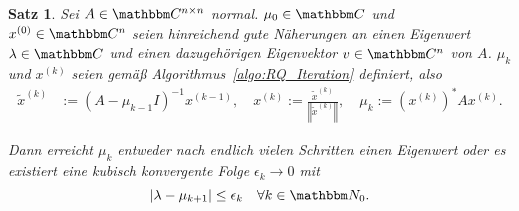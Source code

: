 \documentclass[12pt,a4paper]{book}
\theoremstyle{break}
\newtheorem{theorem}{Satz}[chapter]
\theoremstyle{nonumberplain}
\newcommand{\N}{\mathbbm N}
\newcommand{\C}{\mathbbm C}
\newcommand{\norm}[1]{\left\Vert#1\right\Vert}		%
\newcommand{\1}{\mathbbm{1}} 			      	%
\begin{document}
\begin{theorem}\label{thm:RQ}
Sei $A\in \C^{n\times n}$ normal. $\mu_0\in \C$ und $x^{(0)}\in \C^n$ seien hinreichend gute Näherungen an einen Eigenwert $\lambda\in \C$ und
einen dazugehörigen Eigenvektor $v\in \C^n$ von $A$. $\mu_k$ und $x^{(k)}$ seien gemäß Algorithmus~\ref{algo:RQ_Iteration}
definiert, also
\begin{align*}
\tilde x^{(k)}&:=(A-\mu_{k-1} I)^{-1} x^{(k-1)}, \quad x^{(k)}:=\frac{\tilde x^{(k)}}{\norm{\tilde x^{(k)}}}, \quad 
\mu_k:=(x^{(k)})^* A x^{(k)}.
\end{align*}

Dann erreicht $\mu_k$ entweder nach endlich vielen Schritten einen Eigenwert oder es existiert eine
kubisch konvergente Folge $\epsilon_k\to 0$ mit
\[
|\lambda - \mu_{k+1} | \leq \epsilon_k \quad \forall k\in \N_0.
\]
\end{theorem}
\end{document}
